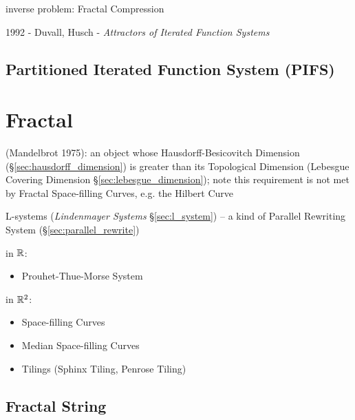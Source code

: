 inverse problem: Fractal Compression

1992 - Duvall, Husch - \emph{Attractors of Iterated Function Systems}



\subsection{Partitioned Iterated Function System (PIFS)}\label{sec:pifs}



\section{Fractal}\label{sec:fractal}

(Mandelbrot 1975): an object whose Hausdorff-Besicovitch Dimension
(\S\ref{sec:hausdorff_dimension}) is greater than its Topological Dimension
(Lebesgue Covering Dimension \S\ref{sec:lebesgue_dimension}); note this
requirement is not met by Fractal Space-filling Curves, e.g. the Hilbert Curve

\asterism

L-systems (\emph{Lindenmayer Systems} \S\ref{sec:l_system}) -- a kind of
Parallel Rewriting System (\S\ref{sec:parallel_rewrite})


in $\mathbb{R}$:
\begin{itemize}
  \item Prouhet-Thue-Morse System
\end{itemize}

in $\mathbb{R}^2$:
\begin{itemize}
  \item Space-filling Curves
  \item Median Space-filling Curves
  \item Tilings (Sphinx Tiling, Penrose Tiling)
\end{itemize}



\subsection{Fractal String}\label{sec:fractal_string}

